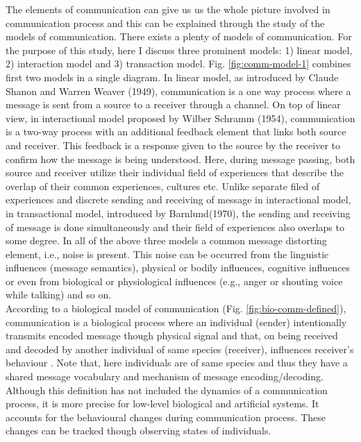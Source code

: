 The elements of communication can give us us the whole picture involved in communication process and this can be explained through the study of the models  of communication. There exists a plenty of models of communication. For the purpose of this study, here I  discuss three prominent models: 1) linear model, 2) interaction model and 3) transaction model.  
Fig. \ref{fig:comm-model-1} combines first two models in a single diagram. In linear model, as introduced by Claude Shanon and Warren Weaver (1949), communication is a one way process where a message is sent from a source to a receiver through a channel. On top of linear view, in interactional model proposed by Wilber Schramm (1954), communication is a two-way process with an additional feedback element  that links both source and receiver. This feedback is a response given to the source by the receiver to confirm how the message is being understood. Here, during message passing, both source and receiver utilize their individual field of experiences that describe the overlap of their common experiences, cultures etc. Unlike separate filed of experiences and discrete sending and receiving of message in interactional model, in transactional model, introduced by Barnlund(1970), the sending and receiving of message is done simultaneously and their  field of experiences also overlaps to some degree. In all of the above three models a common message distorting element, i.e., noise is present. This noise can be occurred from the linguistic influences (message semantics),  physical or bodily influences, cognitive influences or even from biological
or physiological influences (e.g., anger or shouting voice while talking) and so on.\\
According to a biological model of communication (Fig. \ref{fig:bio-comm-defined}), communication is a biological process where an  individual (sender) intentionally transmits encoded message though physical signal and that, on being received and decoded by another individual of same species (receiver), influences receiver's behaviour \cite{Frings1997}. Note that, here individuals are of same species and thus they have a  shared message vocabulary and mechanism of message encoding/decoding. Although  this definition has not included the dynamics of a communication process, it is more precise for low-level biological and artificial systems. It accounts for the behavioural changes during communication process. These changes can be tracked though observing states of individuals.\\   
